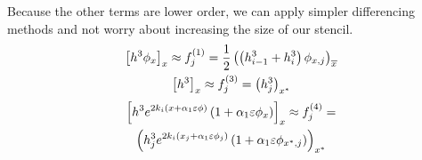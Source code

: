 \begin{frame} 
    Because the other terms are lower order, we can apply simpler differencing methods
    and not worry about increasing the size of our stencil. 
    \begin{gather*}  
        \left[ h^3\phi_x \right]_x \approx f_j^{\left( 1 \right)} = \frac{1}{2}\left( \left( h_{i-1}^3 + h_i^3 \right) \phi_{x, j} \right)_{\overline{x}}\\
        \left[ h^3 \right]_x \approx f_j^{\left( 3 \right)} = \left( h^3_j \right)_{x^*}\\
    \end{gather*}
    \vspace{-4em}
    \begin{multline*}
        \left[ h^3 e^{2k_i \left( x + \alpha_1 \varepsilon \phi \right)} \left( 1 + \alpha_1 \varepsilon \phi_x \right) \right]_x 
        \approx f_j^{\left( 4 \right)} = \\ \left( h^3_j e^{2k_i \left( x_j + \alpha_1 \varepsilon \phi_j \right)} \left( 1 + \alpha_1 \varepsilon \phi_{x^*, j} \right) \right)_{x^*}
    \end{multline*}
\end{frame}